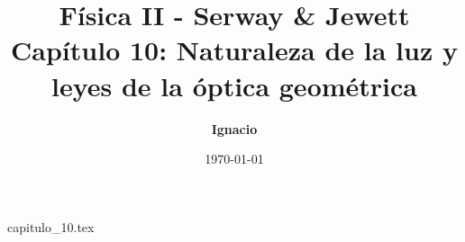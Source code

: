 \documentclass[11pt,spanish,oneside]{report}
\title{\textbf{Física II - Serway \& Jewett} \\ \Large Capítulo 10: Naturaleza de la luz y leyes de la óptica geométrica}
\author{\textbf{Ignacio}}
\date{\today}
\begin{document}
\maketitle

{capitulo_10.tex}
\end{document}
